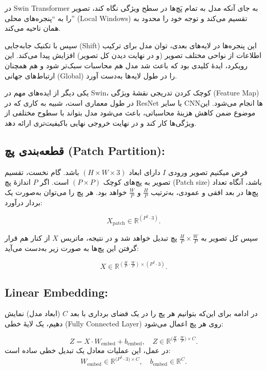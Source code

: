 در Swin Transformer به جای آنکه مدل به تمام پَچ‌ها در سطح ویژگی نگاه کند، تصویر را به “پنجره‌های محلی” (Local Windows) تقسیم می‌کند و توجه خود را محدود به همان ناحیه می‌کند. 

 سپس با تکنیک جابه‌جایی (Shift) این پنجره‌ها در لایه‌های بعدی، توان مدل برای ترکیب اطلاعات از نواحی مختلف تصویر (و در نهایت دیدن کل تصویر) افزایش پیدا می‌کند. این رویکرد، ایدهٔ کلیدی بود که باعث شد مدل هم محاسبات سبک‌تر شود و هم همچنان ارتباط‌های جهانی (Global) را در طول لایه‌ها به‌دست آورد.


یکی دیگر از ایده‌های مهم در Swin، کوچک کردن تدریجی نقشهٔ ویژگی (Feature Map) در طول معماری است، شبیه به کاری که در ResNet یا سایر CNNها انجام می‌شود. این موضوع ضمن کاهش هزینهٔ محاسباتی، باعث می‌شود مدل بتواند با سطوح مختلفی از ویژگی‌ها کار کند و در نهایت خروجی نهایی باکیفیت‌تری ارائه دهد.

   
   
\subsection{ قطعه‌بندی پچ (Patch Partition):}

فرض میکنیم  تصویر ورودی \(\displaystyle I\) دارای ابعاد \(\displaystyle (H \times W \times 3)\) باشد. گام نخست، تقسیم تصویر به پچ‌های کوچک \(\displaystyle (P \times P)\) است. اگر \(P\) اندازهٔ پچ (Patch size) باشد، آنگاه تعداد پچ‌ها در بعد افقی و عمودی، به‌ترتیب \(\displaystyle \frac{H}{P}\) و \(\displaystyle \frac{W}{P}\) خواهد بود. هر پچ را می‌توان به‌صورت یک بردار درآورد:


\[
X_{\text{patch}} \in \mathbb{R}^{(P^2 \cdot 3)}.
\]


سپس کل تصویر به \(\displaystyle \frac{H}{P} \times \frac{W}{P}\) پچ تبدیل خواهد شد و در نتیجه، ماتریس \(\displaystyle X\) از کنار هم قرار گرفتن این پچ‌ها به صورت زیر به‌دست می‌آید:

\[
X \in \mathbb{R}^{\left(\frac{H}{P} \cdot \frac{W}{P}\right) \times \left(P^2 \cdot 3\right)}.
\]


\subsection{Linear Embedding:}

در ادامه برای این‌که بتوانیم هر پچ را در یک فضای برداری با بعد \(\displaystyle C\) (ابعاد مدل) نمایش دهیم، 
یک لایهٔ خطی (Fully Connected Layer) روی هر پچ اعمال می‌شود:


\[
Z = X \cdot W_{\text{embed}} + b_{\text{embed}}, 
\quad
Z \in \mathbb{R}^{\bigl(\tfrac{H}{P} \cdot \tfrac{W}{P}\bigr) \times C}.
\]
در عمل، این عملیات معادل یک تبدیل خطی ساده است:
\[
W_{\text{embed}} \in \mathbb{R}^{\bigl(P^2 \cdot 3\bigr) \times C},
\quad
b_{\text{embed}} \in \mathbb{R}^{C}.
\]
    
